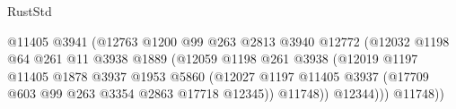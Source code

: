 \begin{lexlean}{RustStd}
\begin{coremodule}
{\begin{coremodule}
{{{{{{{{{{{{{{{{{{{{{{{{{{{{{                                                  @11405
                                                  @3941
                                                  (@12763
                                                    @1200
                                                    @99
                                                    @263
                                                    @2813
                                                    @3940
                                                    @12772
                                                    (@12032
                                                      @1198
                                                      @64
                                                      @261
                                                      @11
                                                      @3938
                                                      @1889
                                                      (@12059
                                                        @1198
                                                        @261
                                                        @3938
                                                        (@12019
                                                          @1197
                                                          @11405
                                                          @1878
                                                          @3937
                                                          @1953
                                                          @5860
                                                          (@12027
                                                            @1197
                                                            @11405
                                                            @3937
                                                            (@17709
                                                              @603
                                                              @99
                                                              @263
                                                              @3354
                                                              @2863
                                                              @17718
                                                              @12345))
                                                          @11748))
                                                      @12344)))
                                                @11748))
}}}}}}}}}}}}}}}}}}}}}}}}}}}}}
\end{coremodule}}
\end{coremodule}
\end{lexlean}

